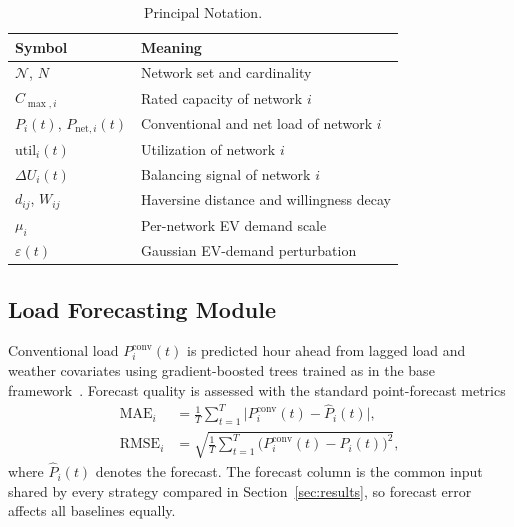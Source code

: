 \documentclass[10pt,journal]{IEEEtran}
\newcommand{\D}{\Delta}
\newcommand{\util}{\mathrm{util}}
\begin{document}
\begin{table}[!t]
\caption{Principal Notation.}
\label{tab:not}
\centering
\begin{tabular}{ll}\toprule
Symbol & Meaning \\ \midrule
$\mathcal{N}$, $N$ & Network set and cardinality \\
$C_{\max,i}$ & Rated capacity of network $i$ \\
$P_i(t)$, $P_{\mathrm{net},i}(t)$ & Conventional and net load of network $i$ \\
$\util_i(t)$ & Utilization of network $i$ \\
$\D U_i(t)$ & Balancing signal of network $i$ \\
$d_{ij}$, $W_{ij}$ & Haversine distance and willingness decay \\
$\mu_i$ & Per-network EV demand scale \\[2pt]
$\varepsilon(t)$ & Gaussian EV-demand perturbation \\ \bottomrule
\end{tabular}
\end{table}

\subsection{Load Forecasting Module}
Conventional load $P^{\mathrm{conv}}_i(t)$ is predicted hour ahead from
lagged load and weather covariates using gradient-boosted trees trained as
in the base framework~\cite{lepolesa2026,chen2016}. Forecast quality is
assessed with the standard point-forecast metrics
\begin{align}
  \mathrm{MAE}_i&=\frac{1}{T}\sum_{t=1}^{T}\bigl|
    P_i^{\mathrm{conv}}(t)-\hat P_i(t)
    \bigr|,\label{eq:mae}\\
  \mathrm{RMSE}_i&=\sqrt{\frac{1}{T}\sum_{t=1}^{T}\bigl(
    P_i^{\mathrm{conv}}(t)-\hat P_i(t)\bigr)^2},\label{eq:rmse}
\end{align}
where $\hat P_i(t)$ denotes the forecast. The forecast column is the common
input shared by every strategy compared in Section~\ref{sec:results}, so
forecast error affects all baselines equally.
\end{document}
